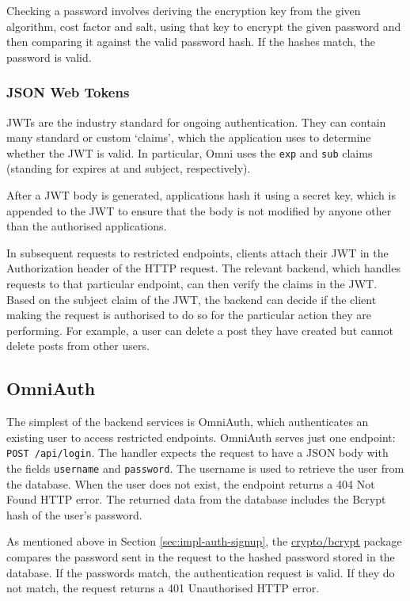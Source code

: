 Checking a password involves deriving the encryption key from the given algorithm, cost factor and salt, using that key to encrypt the given password and then comparing it against the valid password hash. If the hashes match, the password is valid.

\subsubsection{JSON Web Tokens}
JWTs are the industry standard for ongoing authentication. They can contain many standard or custom `claims', which the application uses to determine whether the JWT is valid.
In particular, Omni uses the \verb|exp| and \verb|sub| claims (standing for expires at and subject, respectively). 

After a JWT body is generated, applications hash it using a secret key, which is appended to the JWT to ensure that the body is not modified by anyone other than the authorised applications. 

In subsequent requests to restricted endpoints, clients attach their JWT in the Authorization header of the HTTP request.
The relevant backend, which handles requests to that particular endpoint, can then verify the claims in the JWT.
Based on the subject claim of the JWT, the backend can decide if the client making the request is authorised to do so for the particular action they are performing.
For example, a user can delete a post they have created but cannot delete posts from other users.

\subsection{OmniAuth}
The simplest of the backend services is OmniAuth, which authenticates an existing user to access restricted endpoints.
OmniAuth serves just one endpoint: \verb|POST /api/login|. The handler expects the request to have a JSON body with the fields \verb|username| and \verb|password|. 
The username is used to retrieve the user from the database. When the user does not exist, the endpoint returns a 404 Not Found HTTP error.
The returned data from the database includes the Bcrypt hash of the user's password. 

As mentioned above in Section \ref{sec:impl-auth-signup}, the \underline{\href{https://pkg.go.dev/golang.org/x/crypto/bcrypt}{crypto/bcrypt}} \nocite{gobcryptpkg} package compares the password sent in the request to the hashed password stored in the database.
If the passwords match, the authentication request is valid. If they do not match, the request returns a 401 Unauthorised HTTP error.

